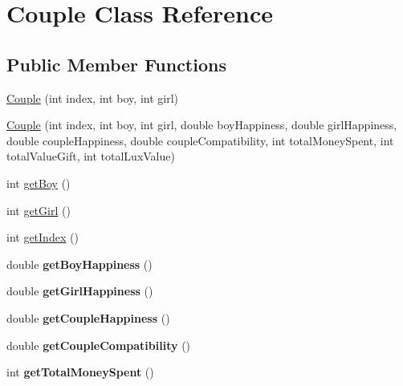 \hypertarget{class_couple}{}\section{Couple Class Reference}
\label{class_couple}
\subsection*{Public Member Functions}
\begin{DoxyCompactItemize}
\item 
\hyperlink{class_couple_ade28403308aff7ddb1ac1e7ec7b94ebf}{Couple} (int index, int boy, int girl)
\item 
\hyperlink{class_couple_a6f82dc74dea2eac7998499841545a796}{Couple} (int index, int boy, int girl, double boy\+Happiness, double girl\+Happiness, double couple\+Happiness, double couple\+Compatibility, int total\+Money\+Spent, int total\+Value\+Gift, int total\+Lux\+Value)
\item 
int \hyperlink{class_couple_af83e7bba22f91af32166d757347c8331}{get\+Boy} ()
\item 
int \hyperlink{class_couple_a102761f3b3c46949a97829d518bfb0fe}{get\+Girl} ()
\item 
int \hyperlink{class_couple_adde1121effca72c7eb13f258c9caff47}{get\+Index} ()
\item 
\mbox{\label{class_couple_a149c13daf2e50bcbaa2e8e11e2070972}} 
double {\bfseries get\+Boy\+Happiness} ()
\item 
\mbox{\label{class_couple_a97b7e4b99943a7b00d64c7b2c025e25a}} 
double {\bfseries get\+Girl\+Happiness} ()
\item 
\mbox{\label{class_couple_a8a93de9d5d49ef45761ed98e89628a48}} 
double {\bfseries get\+Couple\+Happiness} ()
\item 
\mbox{\label{class_couple_a9b73843688fdaf6af8bef3c944f0143d}} 
double {\bfseries get\+Couple\+Compatibility} ()
\item 
\mbox{\label{class_couple_a20793d75ef26223d43d993c9f1b88df2}} 
int {\bfseries get\+Total\+Money\+Spent} ()
\item 
\mbox{\label{class_couple_ac928a5c3d3465767f340fbffd6747d97}} 

\end{DoxyCompactItemize}
